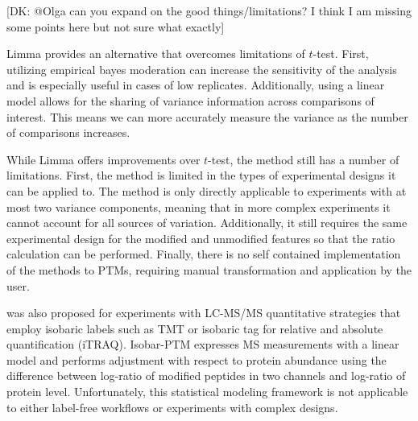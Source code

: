 \documentclass[mcp]{article}
\numberwithin{table}{section}
\def\todo#1{{\color{red}[#1]}}
\begin{document}
\todo{DK: @Olga can you expand on the good things/limitations? I think I am missing some points here but not sure what exactly}

Limma provides an alternative that overcomes limitations of $t$-test. First, utilizing empirical bayes moderation can increase the sensitivity of the analysis and is especially useful in cases of low replicates. Additionally, using a linear model allows for the sharing of variance information across comparisons of interest. This means we can more accurately measure the variance as the number of comparisons increases.

While Limma offers improvements over $t$-test, the method still has a number of limitations. First, the method is limited in the types of experimental designs it can be applied to. The method is only directly applicable to experiments with at most two variance components, meaning that in more complex experiments it cannot account for all sources of variation. Additionally, it still requires the same experimental design for the modified and unmodified features so that the ratio calculation can be performed. Finally, there is no self contained implementation of the methods to PTMs, requiring manual transformation and application by the user.


\medskip {} was also proposed for experiments with LC-MS/MS quantitative strategies that employ isobaric labels such as TMT or isobaric tag for relative and absolute quantification (iTRAQ)\cite{Breitwieser:2013}. Isobar-PTM expresses MS measurements with a linear model and performs adjustment with respect to protein abundance using the difference between log-ratio of modified peptides in two channels and log-ratio of protein level. Unfortunately, this statistical modeling framework is not applicable to either label-free workflows or experiments with complex designs. 
\end{document}
